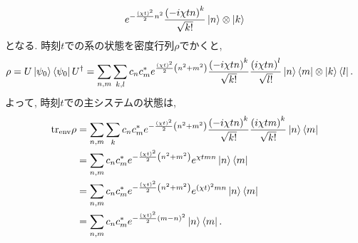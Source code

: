 \begin{ex}
\begin{align*}
        e^{- \frac{\left( \chi t\right)^2}{2}n^2}
        \frac{\left( - i \chi t n \right)^k}{ \sqrt{k!}}
        \ket{n} \otimes \ket{k} \\
    \end{align*}
    となる. 時刻$t$での系の状態を密度行列$\rho$でかくと,
    \begin{align*}
        \rho
        =
        U \ket{\psi_0} \bra{\psi_0} U ^\dagger
         & =
        \sum_{n,m} \sum_{k,l}
        c_n c_m^*
        e^{\frac{\left( \chi t\right)^2}{2} \left( n^2 + m^2\right)}
        \frac{\left( - i \chi t n \right)^k}{ \sqrt{k!}}
        \frac{\left(  i \chi t n \right)^l}{ \sqrt{l!}}
        \ket{n}\bra{m} \otimes \ket{k}\bra{l}.
    \end{align*}
    よって, 時刻$t$での主システムの状態は,
    \begin{align*}
        \mathrm{tr}_\mathrm{env} \rho
         & =
        \sum_{n,m}\sum_{k}
        c_n c_m^*
        e^{ - \frac{\left( \chi t\right)^2}{2} \left( n^2 + m^2\right)}
        \frac{\left( - i \chi t n \right)^k}{ \sqrt{k!}}
        \frac{\left(  i \chi t m \right)^k}{ \sqrt{k!}}
        \ket{n}\bra{m} \\
         & =
        \sum_{n,m}
        c_n c_m^*
        e^{ - \frac{\left( \chi t\right)^2}{2} \left( n^2 + m^2\right)}
        e^{\chi t m n}
        \ket{n}\bra{m} \\
         & =
        \sum_{n,m}
        c_n c_m^*
        e^{ - \frac{\left( \chi t\right)^2}{2} \left( n^2 + m^2\right)}
        e^{ \left( \chi t \right)^2 m n}
        \ket{n}\bra{m} \\
         & =
        \sum_{n,m}
        c_n c_m^*
        e^{ - \frac{\left( \chi t\right)^2}{2} \left( m - n \right)^2}
        \ket{n}\bra{m}.
    \end{align*}
\end{ex}